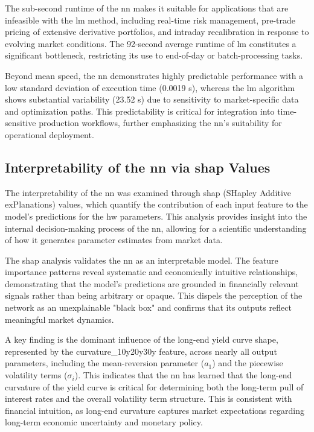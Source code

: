 The sub-second runtime of the \ac{nn} makes it suitable for applications that are infeasible with the \ac{lm} method, including real-time risk management, pre-trade pricing of extensive derivative portfolios, and intraday recalibration in response to evolving market conditions. The 92-second average runtime of \ac{lm} constitutes a significant bottleneck, restricting its use to end-of-day or batch-processing tasks.

Beyond mean speed, the \ac{nn} demonstrates highly predictable performance with a low standard deviation of execution time (0.0019 s), whereas the \ac{lm} algorithm shows substantial variability (23.52 s) due to sensitivity to market-specific data and optimization paths. This predictability is critical for integration into time-sensitive production workflows, further emphasizing the \ac{nn}'s suitability for operational deployment.

\subsection{Interpretability of the \ac{nn} via \ac{shap} Values}
The interpretability of the \ac{nn} was examined through \ac{shap} (SHapley Additive exPlanations) values, which quantify the contribution of each input feature to the model's predictions for the \ac{hw} parameters. This analysis provides insight into the internal decision-making process of the \ac{nn}, allowing for a scientific understanding of how it generates parameter estimates from market data.

The \ac{shap} analysis validates the \ac{nn} as an interpretable model. The feature importance patterns reveal systematic and economically intuitive relationships, demonstrating that the model's predictions are grounded in financially relevant signals rather than being arbitrary or opaque. This dispels the perception of the network as an unexplainable "black box" and confirms that its outputs reflect meaningful market dynamics.

A key finding is the dominant influence of the long-end yield curve shape, represented by the curvature\_10y20y30y feature, across nearly all output parameters, including the mean-reversion parameter (\(a_1\)) and the piecewise volatility terms (\(\sigma_i\)). This indicates that the \ac{nn} has learned that the long-end curvature of the yield curve is critical for determining both the long-term pull of interest rates and the overall volatility term structure. This is consistent with financial intuition, as long-end curvature captures market expectations regarding long-term economic uncertainty and monetary policy.

